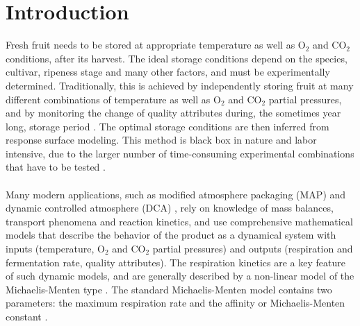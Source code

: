 \section{Introduction}
Fresh fruit needs to be stored at appropriate temperature as well as $\text{O}_2$ and $\text{CO}_2$ conditions, after its harvest. The ideal storage conditions depend on the species, cultivar, ripeness stage and many other factors, and must be experimentally determined. Traditionally, this is achieved by independently storing fruit at many different combinations of temperature as well as $\text{O}_2$ and $\text{CO}_2$ partial pressures, and by monitoring the change of quality attributes during, the sometimes year long, storage period \parencite{fidler}. The optimal storage conditions are then inferred from response surface modeling. This method is black box in nature and labor intensive, due to the larger number of time-consuming experimental combinations that have to be tested \parencite{saltveit}.
\\
\\
Many modern applications, such as modified atmosphere packaging (MAP) \parencite{MAP1,MAP2} and dynamic controlled atmosphere (DCA) \parencite{bessemans}, rely on knowledge of mass balances, transport phenomena and reaction kinetics, and use comprehensive mathematical models that describe the behavior of the product as a dynamical system with inputs (temperature, $\text{O}_2$ and $\text{CO}_2$ partial pressures) and outputs (respiration and fermentation rate, quality attributes). The respiration kinetics are a key feature of such dynamic models, and are generally described by a non-linear model of the Michaelis-Menten type \parencite{maarten1}. The standard Michaelis-Menten model contains two parameters: the maximum respiration rate and the affinity or Michaelis-Menten constant \parencite{peppelenbos}.
\\
\\
